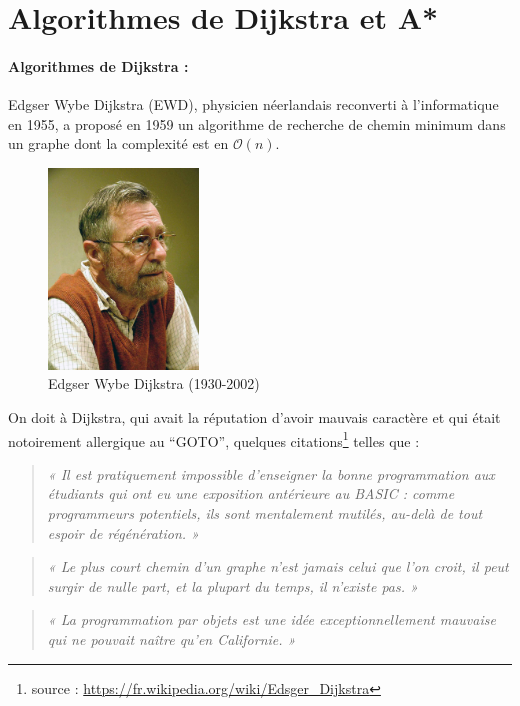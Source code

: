 \section{Algorithmes de Dijkstra et A*}


\paragraph{Algorithmes de Dijkstra : }Edgser Wybe Dijkstra (EWD), physicien néerlandais reconverti à l'informatique en 1955, a proposé en 1959 un algorithme de recherche de chemin minimum dans un graphe dont la complexité est en $\mathcal{O}(n)$. 

\begin{figure}[htp]
  \centering
  \includegraphics[width=4cm]{images/Edsger_Wybe_Dijkstra}
  \caption{Edgser Wybe Dijkstra (1930-2002)}
  \label{fig:une-autre-image}
\end{figure}

On doit à Dijkstra, qui avait la réputation d'avoir mauvais caractère et qui était notoirement allergique au ``GOTO'',
quelques citations\footnote{source : \url{https://fr.wikipedia.org/wiki/Edsger_Dijkstra}} telles que :


\begin{quote}
\textit{« Il est pratiquement impossible d'enseigner la bonne programmation aux étudiants 
qui ont eu une exposition antérieure au BASIC : comme programmeurs potentiels, 
ils sont mentalement mutilés, au-delà de tout espoir de régénération. »}
\end{quote}

\begin{quote}
\textit{« Le plus court chemin d'un graphe n'est jamais celui que l'on croit, 
il peut surgir de nulle part, et la plupart du temps, il n'existe pas. »}
\end{quote}

\begin{quote}
\textit{« La programmation par objets est une idée exceptionnellement mauvaise qui ne pouvait naître qu'en Californie. »}
\end{quote}



